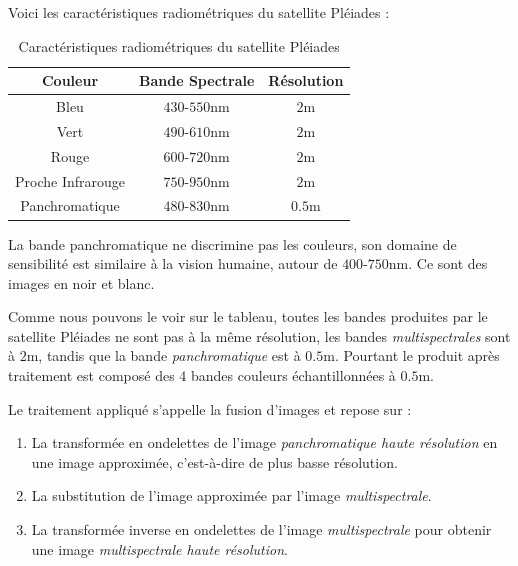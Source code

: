 \documentclass[a4paper, 11pt]{report}
\begin{document}
Voici les caractéristiques radiométriques du satellite Pléiades \citep{Wikipedia2017b}:
\begin{table}[H]
	\centering
	\begin{tabular}{|c|c|c|}
	\hline
	Couleur & Bande Spectrale & Résolution \\
	\hline 
	Bleu & $430$-$550$nm & $2$m \\ 
	\hline 
	Vert & $490$-$610$nm & $2$m \\ 
	\hline 
	Rouge & $600$-$720$nm & $2$m \\ 
	\hline 
	Proche Infrarouge & $750$-$950$nm & $2$m \\ 
	\hline 
	Panchromatique & $480$-$830$nm & $0.5$m \\ 
	\hline 
	\end{tabular}
	\caption{Caractéristiques radiométriques du satellite Pléiades}
\end{table}
La bande panchromatique ne discrimine pas les couleurs, son domaine de sensibilité est similaire à la vision humaine, autour de $400$-$750$nm. Ce sont des images en noir et blanc.

Comme nous pouvons le voir sur le tableau, toutes les bandes produites par le satellite Pléiades ne sont pas à la même résolution, les bandes \emph{multispectrales} sont à $2$m, tandis que la bande \emph{panchromatique} est à $0.5$m.
Pourtant le produit après traitement est composé des $4$ bandes couleurs échantillonnées à $0.5$m.

Le traitement appliqué s'appelle la fusion d'images et repose sur :
\begin{enumerate}
	\item La transformée en ondelettes de l'image \emph{panchromatique haute résolution} en une image approximée, c'est-à-dire de plus basse résolution.
	\item La substitution de l'image approximée par l'image \emph{multispectrale}.
	\item La transformée inverse en ondelettes de l'image \emph{multispectrale} pour obtenir une image \emph{multispectrale haute résolution}.
\end{enumerate}
\end{document}
